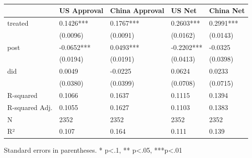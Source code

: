 \begin{table}
\caption{}
\label{}
\begin{center}
\begin{tabular}{lllll}
\hline
               & US Approval & China Approval & US Net     & China Net  \\
\hline
treated        & 0.1426***   & 0.1767***      & 0.2603***  & 0.2991***  \\
               & (0.0096)    & (0.0091)       & (0.0162)   & (0.0143)   \\
post           & -0.0652***  & 0.0493***      & -0.2202*** & -0.0325    \\
               & (0.0194)    & (0.0191)       & (0.0413)   & (0.0398)   \\
did            & 0.0049      & -0.0225        & 0.0624     & 0.0233     \\
               & (0.0380)    & (0.0399)       & (0.0708)   & (0.0715)   \\
R-squared      & 0.1066      & 0.1637         & 0.1115     & 0.1394     \\
R-squared Adj. & 0.1055      & 0.1627         & 0.1103     & 0.1383     \\
N              & 2352        & 2352           & 2352       & 2352       \\
R²             & 0.107       & 0.164          & 0.111      & 0.139      \\
\hline
\end{tabular}
\end{center}
\end{table}
\bigskip
Standard errors in parentheses. \newline 
* p<.1, ** p<.05, ***p<.01